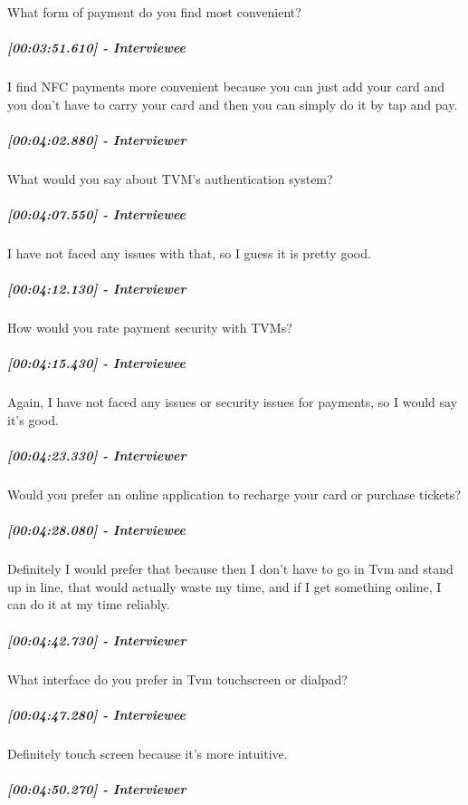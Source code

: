\documentclass[a4paper,12pt]{article}
\begin{document}
What form of payment do you find most convenient?

\hypertarget{interviewee-15}{%
\subparagraph{{[}00:03:51.610{]} - Interviewee}\label{interviewee-15}}

I find NFC payments more convenient because you can just add your card
and you don't have to carry your card and then you can simply do it by
tap and pay.

\hypertarget{interviewer-16}{%
\subparagraph{{[}00:04:02.880{]} - Interviewer}\label{interviewer-16}}

What would you say about TVM's authentication system?

\hypertarget{interviewee-16}{%
\subparagraph{{[}00:04:07.550{]} - Interviewee}\label{interviewee-16}}

I have not faced any issues with that, so I guess it is pretty good.

\hypertarget{interviewer-17}{%
\subparagraph{{[}00:04:12.130{]} - Interviewer}\label{interviewer-17}}

How would you rate payment security with TVMs?

\hypertarget{interviewee-17}{%
\subparagraph{{[}00:04:15.430{]} - Interviewee}\label{interviewee-17}}

Again, I have not faced any issues or security issues for payments, so I
would say it's good.

\hypertarget{interviewer-18}{%
\subparagraph{{[}00:04:23.330{]} - Interviewer}\label{interviewer-18}}

Would you prefer an online application to recharge your card or purchase
tickets?

\hypertarget{interviewee-18}{%
\subparagraph{{[}00:04:28.080{]} - Interviewee}\label{interviewee-18}}

Definitely I would prefer that because then I don't have to go in Tvm
and stand up in line, that would actually waste my time, and if I get
something online, I can do it at my time reliably.

\hypertarget{interviewer-19}{%
\subparagraph{{[}00:04:42.730{]} - Interviewer}\label{interviewer-19}}

What interface do you prefer in Tvm touchscreen or dialpad?

\hypertarget{interviewee-19}{%
\subparagraph{{[}00:04:47.280{]} - Interviewee}\label{interviewee-19}}

Definitely touch screen because it's more intuitive.

\hypertarget{interviewer-20}{%
\subparagraph{{[}00:04:50.270{]} - Interviewer}\label{interviewer-20}}
\end{document}
